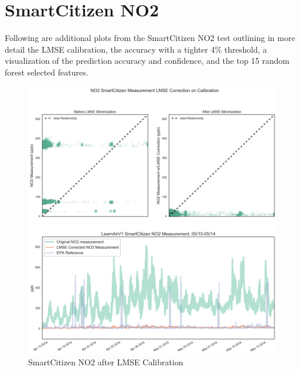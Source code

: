 \FloatBarrier
\section{SmartCitizen NO2}
\FloatBarrier

Following are additional plots from the SmartCitizen NO2 test outlining in more detail the LMSE calibration, the accuracy with a tighter 4\% threshold, a visualization of the prediction accuracy and confidence, and the top 15 random forest selected features.

\begin{figure}[htb]
 	\includegraphics[width=\textwidth]{figs/sck_no2_lmse}               
 	 \caption{SmartCitizen NO2 after LMSE Calibration}
  	\label{fig:sck_no2_lmse}
\end{figure}

